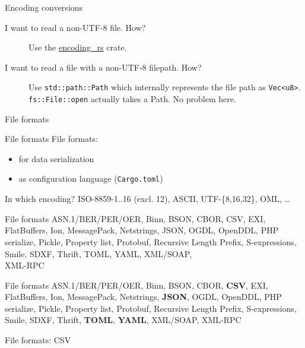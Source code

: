 \documentclass{beamer}
\begin{document}
\begin{frame}[fragile]{Encoding conversions}
  \begin{description}
    \item[I want to read a non-UTF-8 file. How?]
      Use the \href{https://docs.rs/encoding_rs/0.8.13/encoding_rs/}{encoding\_rs} crate.
    \item[I want to read a file with a non-UTF-8 filepath. How?]
      Use \texttt{std::path::Path} which internally represents the file path as \texttt{Vec<u8>}. \texttt{fs::File::open} actually takes a Path. No problem here.
  \end{description}
\end{frame}

\begin{frame}[standout]
  File formats
\end{frame}

\begin{frame}[fragile]{File formats}
  File formats:
  \begin{itemize}
    \item for data serialization
    \item as configuration language (\texttt{Cargo.toml})
  \end{itemize}
  In which encoding? ISO-8859-1..16 (excl. 12), ASCII, UTF-\{8,16,32\}, OML, \dots
\end{frame}

\begin{frame}[fragile]{File formats}
  ASN.1/BER/PER/OER, Binn, BSON, CBOR, CSV, EXI, FlatBuffers, Ion, MessagePack, Netstrings, JSON, OGDL, OpenDDL, PHP serialize, Pickle, Property list, Protobuf, Recursive Length Prefix, S-expressions, Smile, SDXF, Thrift, TOML, YAML, XML/SOAP, \\ XML-RPC
\end{frame}

\begin{frame}[fragile]{File formats}
  ASN.1/BER/PER/OER, Binn, BSON, CBOR, \textbf{CSV}, EXI, FlatBuffers, Ion, MessagePack, Netstrings, \textbf{JSON}, OGDL, OpenDDL, PHP serialize, Pickle, Property list, Protobuf, Recursive Length Prefix, S-expressions, Smile, SDXF, Thrift, \textbf{TOML}, \textbf{YAML}, XML/SOAP, XML-RPC
\end{frame}
  
\begin{frame}[standout]
  File formats: CSV
\end{frame}
\end{document}
